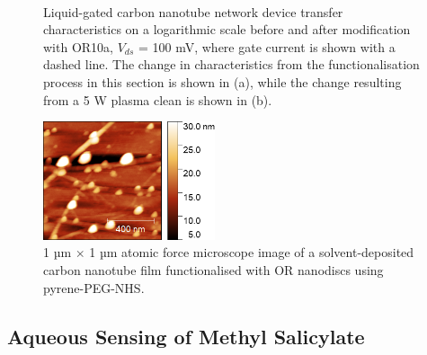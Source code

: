 \documentclass[
  a4paper,
]{scrbook}
\begin{document}
\begin{figure}
\begin{minipage}[t]{0.45\linewidth}
{{}

}

\end{minipage}%
%
\begin{minipage}[t]{0.01\linewidth}

{\centering 

~

}

\end{minipage}%

\caption[Liquid-gated carbon nanotube network device transfer
characteristics on a logarithmic scale before and after modification
with OR10a, compared to liquid-gated characteristics before and after a
5 W plasma clean.]{\label{fig-OR10a-TX-comparison}Liquid-gated carbon
nanotube network device transfer characteristics on a logarithmic scale
before and after modification with OR10a, \(V_{ds}\) = 100 mV, where
gate current is shown with a dashed line. The change in characteristics
from the functionalisation process in this section is shown in (a),
while the change resulting from a 5 W plasma clean is shown in (b).}

\end{figure}

\begin{figure}

{\centering \includegraphics[width=0.45\textwidth,height=\textheight]{figures/ch7/Ned_funcverification_PPNHSwamine_R_1um_20220414_00466.png}

}

\caption[1 µm \(\times\) 1 µm atomic force microscope image of a
solvent-deposited carbon nanotube film functionalised with OR nanodiscs
using pyrene-PEG-NHS.]{\label{fig-PPN-linker}1 µm \(\times\) 1 µm atomic
force microscope image of a solvent-deposited carbon nanotube film
functionalised with OR nanodiscs using pyrene-PEG-NHS.}

\end{figure}

\hypertarget{sec-MeSal-aqueous-sensing}{%
\subsection{Aqueous Sensing of Methyl
Salicylate}\label{sec-MeSal-aqueous-sensing}}
\end{document}
